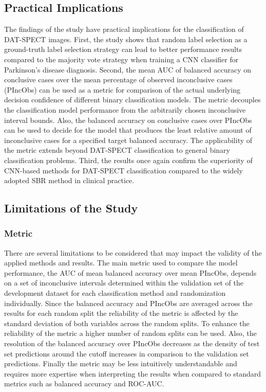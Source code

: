 \subsection{Practical Implications}

The findings of the study have practical implications for the classification of DAT-SPECT images.
First, the study shows that random label selection as a ground-truth label selection strategy 
can lead to better performance results compared to the majority vote strategy 
when training a CNN classifier for Parkinson's disease diagnosis.
Second, the mean AUC of balanced accuracy on conclusive cases over the mean percentage of observed inconclusive cases (PIncObs)
can be used as a metric for comparison of the actual underlying decision confidence of 
different binary classification models.
The metric decouples the classification model performance from the arbitrarily chosen inconclusive interval bounds.
Also, the balanced accuracy on conclusive cases over PIncObs can be used to decide for the model that 
produces the least relative amount of inconclusive cases for a specified target balanced accuracy.
The applicability of the metric extends beyond DAT-SPECT classification to general binary classification problems.
Third, the results once again confirm the superiority of CNN-based methods for DAT-SPECT classification compared to the
widely adopted SBR method in clinical practice.


\subsection{Limitations of the Study}

\subsubsection{Metric}

There are several limitations to be considered that may impact the validity of the applied methods and results.
The main metric used to compare the model performance, the AUC of mean balanced accuracy over mean PIncObs, 
depends on a set of inconclusive intervals determined within the validation set of the development dataset 
for each classification method and randomization individually.
Since the balanced accuracy and PIncObs are averaged across the results for each random split 
the reliability of the metric is affected by the standard deviation of both variables across the random splits.
To enhance the reliability of the metric a higher number of random splits can be used.
Also, the resolution of the balanced accuracy over PIncObs decreases as the density of test set 
predictions around the cutoff increases in comparison to the validation set predictions.
Finally the metric may be less intuitively understandable and requires more expertise when interpreting the results
when compared to standard metrics such as balanced accuracy and ROC-AUC.


